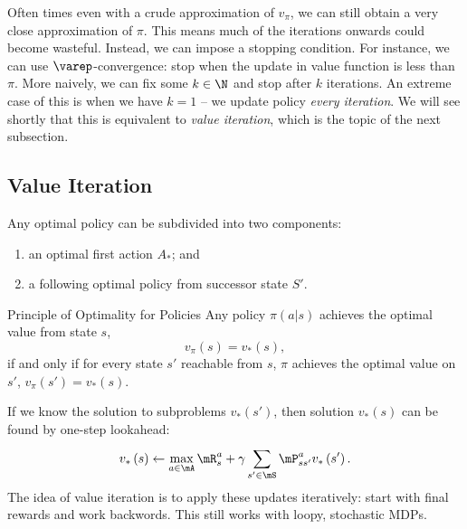 \documentclass[RL]{subfiles}
\begin{document}
    \np Often times even with a crude approximation of $v_{\pi}$, we can still obtain a very close approximation of $\pi$. This means much of the iterations onwards could become wasteful. Instead, we can impose a stopping condition. For instance, we can use $\varep$-convergence: stop when the update in value function is less than $\pi$. More naively, we can fix some $k\in\N$ and stop after $k$ iterations. An extreme case of this is when we have $k=1$ -- we update policy \textit{every iteration}. We will see shortly that this is equivalent to \textit{value iteration}, which is the topic of the next subsection.

   \subsection{Value Iteration}

   Any optimal policy can be subdivided into two components:
   \begin{enumerate}
       \item an optimal first action $A_*$; and
        \item a following optimal policy from successor state $S'$.
   \end{enumerate}
    
   \begin{theorem}{Principle of Optimality for Policies}
       Any policy $\pi\left( a|s \right)$ achieves the optimal value from state $s$,
       \begin{equation*}
           v_{\pi}\left( s \right) = v_{*}\left( s \right),
       \end{equation*}
       if and only if for every state $s'$ reachable from $s$, $\pi$ achieves the optimal value on $s'$, $v_{\pi}\left( s' \right)=v_{*}\left( s \right)$.
   \end{theorem}

   \rruleline

   \np If we know the solution to subproblems $v_{*}\left( s' \right)$, then solution $v_{*}\left( s \right)$ can be found by one-step lookahead:
   \begin{equation*}
       v_{*}\left( s \right) \leftarrow \max_{a\in\mA} \mR^a_s + \gamma \sum^{}_{s'\in\mS}\mP^a_{ss'}v_{*}\left( s' \right).
   \end{equation*}
   The idea of value iteration is to apply these updates iteratively: start with final rewards and work backwords. This still works with loopy, stochastic MDPs.
    
    
    
    
    
    
    
    
    
    
    
    
    
    
    
    
    
    
    
    
    
    
    
    
    
    
    
    
    
    
    
    
    
    
    
    
    
\end{document}

